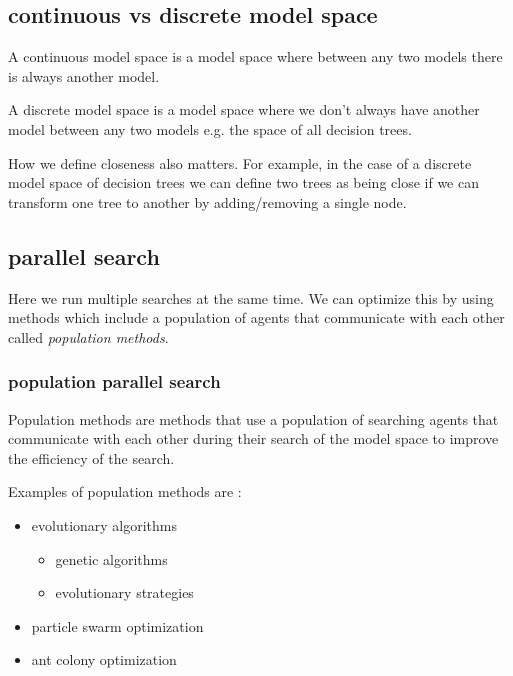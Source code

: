 \documentclass[12pt]{article}
\begin{document}
\subsection{continuous vs discrete model space}

\begin{definition}
    A continuous model space is a model space where between any two models there is always another model. 
\end{definition}

\begin{definition}
    A discrete model space is a model space where we don't always have another model between any two models e.g. the space of all decision trees.
\end{definition}

How we define closeness also matters. For example, in the case of a discrete model space of decision trees we can define two trees as being close if we can transform one tree to another by adding/removing a single node.

\subsection{parallel search}

Here we run multiple searches at the same time. We can optimize this by using methods which include a population of agents that communicate with each other called \textit{population methods}.

\subsubsection*{population parallel search}

\begin{definition}
    Population methods are methods that use a population of searching agents that communicate with each other during their search of the model space to improve the efficiency of the search.
\end{definition}

Examples of population methods are :
\begin{itemize}[leftmargin=*, noitemsep]
    \item evolutionary algorithms
    \begin{itemize}[leftmargin=*, noitemsep]
        \item genetic algorithms
        \item evolutionary strategies
    \end{itemize}
    \item particle swarm optimization
    \item ant colony optimization
\end{itemize}
\end{document}
